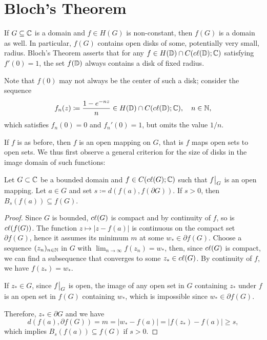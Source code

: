 \section{Bloch's Theorem}
\label{sec:blochs-theorem}

If $G \subseteq \mathbb{C}$ is a domain and $f \in H(G)$ is non-constant, then $f(G)$ is a domain as well. In particular, $f(G)$ contains open disks of some, potentially very small, radius. Bloch's Theorem asserts that for any $f \in H(\mathbb{D}) \cap C(c\ell({\mathbb{D}}); \mathbb{C})$ satisfying $f'(0) = 1$, the set $f(\mathbb{D})$ always contains a disk of fixed radius.

Note that $f(0)$ may not always be the center of such a disk; consider the sequence
\begin{equation*}
    f_n(z) \coloneqq \frac{1 - e^{- n z}}{n} \in H(\mathbb{D}) \cap C(c\ell({\mathbb{D}}); \mathbb{C}), \quad n \in \mathbb{N},
\end{equation*}
which satisfies $f_n(0) = 0$ and $f_n'(0) = 1$, but omits the value $1 / n$.

If $f$ is as before, then $f$ is an open mapping on $G$, that is $f$ maps open sets to open sets. We thus first observe a general criterion for the size of disks in the image domain of such functions:

\begin{lemma} \label{lem:bloch-lemma-1}
    Let $G \subset \mathbb{C}$ be a bounded domain and $f \in C(c\ell({G}); \mathbb{C})$ such that $\restr{f}{G}$ is an open mapping. Let $a \in G$ and set $s \coloneqq d(f(a), f(\partial G))$. If $s > 0$, then $B_{s}(f(a)) \subseteq f(G)$.
\end{lemma}

\begin{proof}
    Since $G$ is bounded, $c\ell({G})$ is compact and by continuity of $f$, so is $c\ell({f(G)})$.
    The function $z \mapsto \vert z - f(a) \vert$ is continuous on the compact set $\partial f(G)$, hence it assumes its minimum $m$ at some $w_* \in \partial f(G)$. Choose a sequence $(z_n)_{n \in \mathbb{N}}$ in $G$ with $\lim_{n \to \infty} f(z_n) = w_*$, then, since $c\ell({G})$ is compact, we can find a subsequence that converges to some $z_* \in c\ell({G})$. By continuity of $f$, we have $f(z_*) = w_*$.

    If $z_* \in G$, since $\restr{f}{G}$ is open, the image of any open set in $G$ containing $z_*$ under $f$ is an open set in $f(G)$ containing $w_*$, which is impossible since $w_* \in \partial f(G)$.

    Therefore, $z_* \in \partial G$ and we have
    $$ d(f(a), \partial f(G)) = m = \vert w_* - f(a) \vert = \vert f(z_*) - f(a) \vert \geq s, $$
    which implies $B_{s}(f(a)) \subseteq f(G)$ if $s > 0$.
\end{proof}

